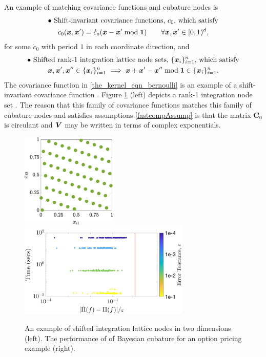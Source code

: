 \documentclass[sts]{imsart}
\numberwithin{equation}{section}
\theoremstyle{plain}
\newcommand{\vC}{\boldsymbol{C}}
\begin{document}
An example of matching covariance functions and cubature nodes is 
\begin{multline*}
    \bullet \text{ Shift-invariant covariance functions, $c_0$, which satisfy}  \\ 
    c_0(\vx, \vx') = \mathring{c}_o(\vx - \vx' \bmod \vone) \qquad \forall \vx, \vx' \in [0,1)^d,
\end{multline*}
for some $\mathring{c}_0$ with period $1$ in each coordinate direction, and
\begin{multline*}
    \bullet \text{ Shifted rank-1 integration lattice node sets, $\{\vx_i\}_{i=1}^n$, which satisfy} \\
    \vx, \vx' , \vx'' \in \{\vx_i\}_{i=1}^n \implies \vx + \vx' - \vx'' \bmod \vone \in \{\vx_i\}_{i=1}^n. 
\end{multline*}
The covariance function in \eqref{the_kernel_eqn_bernoulli} is an example of a shift-invariant covariance function \citep{Hic98b}.  Figure \ref{fig:latfig} (left) depicts a rank-1 integration node set \cite{SloJoe94,DicEtal14a}.  The reason that this family of covariance functions matches this family of cubature nodes and satisfies assumptions \eqref{fastcompAssump} is that the matrix $\vC_0$ is circulant and $\boldsymbol{V}$ may be written in terms of complex exponentials.
\begin{figure}
    \centering
    \includegraphics[height = 4.5cm]{ShiftedLatticePoints.eps} \qquad	
    \includegraphics[height = 4.5cm]{"optPrice_guaranteed_time_full_Baker_d12_r1_2018-Sep-6"}
    \caption{An example of shifted integration lattice nodes in two dimensions (left). The performance of of Bayesian cubature for an option pricing example (right).}
    \label{fig:latfig}
\end{figure}
\end{document}
